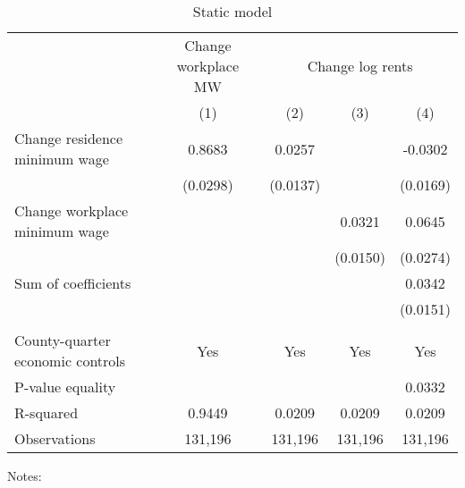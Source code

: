 \begin{table}
    \caption{Static model}
    \label{tab:static}

    \begin{tabular}{l*{4}{c}}
        \toprule
        & \multicolumn{1}{c}{Change workplace MW}
            & \multicolumn{3}{c}{Change log rents}                            \\ \cmidrule(lr){2-2}\cmidrule(lr){3-5}
                                           & (1)   & (2)   & (3)   & (4)      \\ \midrule
        Change residence minimum wage      &  0.8683  &  0.0257  &       &  -0.0302     \\
                                           & (0.0298) & (0.0137) &       & (0.0169)    \\
        Change workplace minimum wage      &       &       &  0.0321  & 0.0645      \\
                                           &       &       & (0.0150) & (0.0274)    \\ \midrule
        Sum of coefficients                &       &       &       &  0.0342     \\
                                           &       &       &       & (0.0151)    \\
                                           &       &       &       &          \\ \midrule
        County-quarter economic controls   &  Yes  & Yes   & Yes   & Yes      \\
        P-value equality                   &       &       &       & 0.0332      \\
        R-squared                          &  0.9449  &  0.0209  &  0.0209  & 0.0209      \\
        Observations                       & 131,196  & 131,196  & 131,196  & 131,196     \\\bottomrule
    \end{tabular}

    \begin{minipage}{.95\textwidth} \footnotesize
        \vspace{2mm}
        Notes: 
    \end{minipage}
\end{table}
